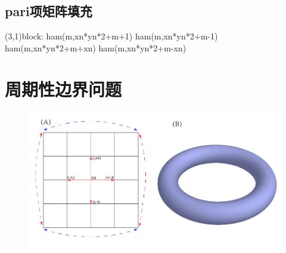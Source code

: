 \documentclass[a4paper,12pt]{ctexart}
\numberwithin{equation}{section}
\begin{document}
\subsection{pari项矩阵填充}
(3,1)block:  ham(m,xn*yn*2+m+1)   ham(m,xn*yn*2+m-1)   ham(m,xn*yn*2+m+xn) ham(m,xn*yn*2+m-xn)

\section{周期性边界问题}
\begin{figure}[h]
	\centering
	\includegraphics[scale=0.6]{periodic.png}
\end{figure}











	
\end{document}
